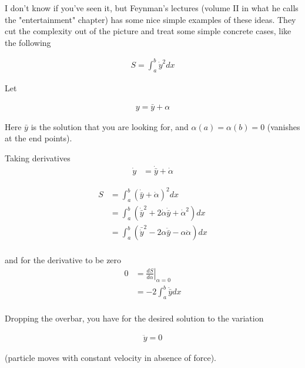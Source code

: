 \documentclass{article}
\begin{document}
%
%

%

%
%

I don't know if you've seen it, but Feynman's lectures (volume II in what he calls the "entertainment" chapter) 
has some nice simple examples of these ideas.
They cut the complexity out of the picture and treat some simple concrete cases, like the following

\begin{align*}
S = \int_{a}^b \dot{y}^2 dx
\end{align*}

Let 

\begin{align*}
y = \bar{y} + \alpha
\end{align*}

Here $\bar{y}$ is the solution that you are looking for, and $\alpha(a) = \alpha(b) = 0$ (vanishes at the end points).

Taking derivatives
\begin{align*}
\dot{y} &= \dot{\bar{y}} + \dot{\alpha}
\end{align*}

\begin{align*}
S 
&= \int_{a}^b \left(\dot{\bar{y}} + \dot{\alpha} \right)^2 dx \\
&= \int_{a}^b \left(\dot{\bar{y}}^2 + 2 \dot{\alpha}\dot{\bar{y}} + \dot{\alpha}^2  \right) dx \\
&= \int_{a}^b \left(\bar{\dot{y}}^2 - 2 {\alpha}\ddot{\bar{y}} - {\alpha}\ddot{\alpha}  \right) dx \\
\end{align*}

and for the derivative to be zero
\begin{align*}
0 &= \left. \frac{dS }{d\alpha} \right\vert_{\alpha = 0} \\
&= -2 \int_{a}^b \ddot{\bar{y}} dx \\
\end{align*}

Dropping the overbar, you have for the desired solution to the variation

\begin{align*}
\ddot{y} = 0
\end{align*}

(particle moves with constant velocity in absence of force).
\end{document}
